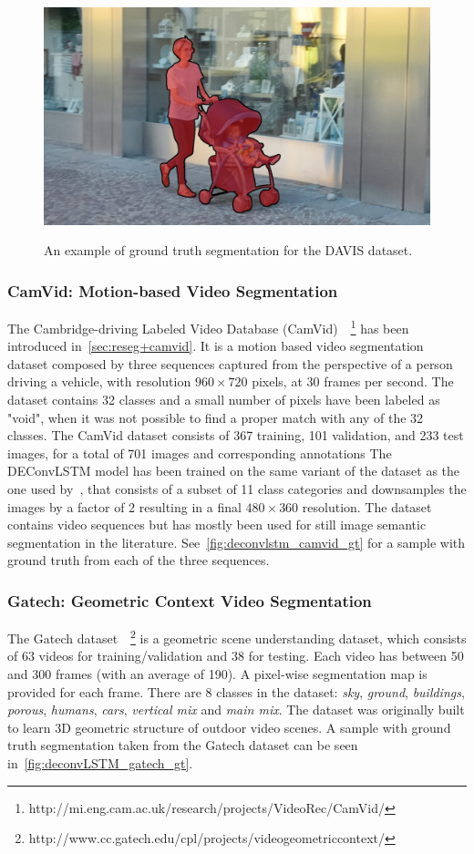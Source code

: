 \begin{figure}[t]
    \includegraphics[width=0.3\columnwidth]{img/deconvLSTM/davis_gt9.jpg}\\
    \caption{An example of ground truth segmentation for the DAVIS dataset.}
    \label{fig:deconvlstm_davis_gt}
\end{figure}


\subsubsection{CamVid: Motion-based Video Segmentation}
\label{sec:deconvLSTM_camvid}
The Cambridge-driving Labeled Video Database (CamVid)~\citep{
Brostow2010semantic}~\footnote{%
http://mi.eng.cam.ac.uk/research/projects/VideoRec/CamVid/}
has been introduced in~\autoref{sec:reseg+camvid}. It is a motion based video
segmentation dataset composed by three sequences captured from the perspective
of a person driving a vehicle, with resolution $960 \times 720$ pixels, at 30
frames per second. The dataset contains 32 classes and a small number of pixels
have been labeled as "void", when it was not possible to find a proper match
with any of the 32 classes. The CamVid dataset consists of 367 training, 101
validation, and 233 test images, for a total of 701 images and corresponding
annotations The DEConvLSTM model has been trained on the same variant of the
dataset as the one used by~\cite{badrinarayanan2015segnet}, that consists of a
subset of 11 class categories and downsamples the images by a factor of 2
resulting in a final $480 \times 360$ resolution. The dataset contains video
sequences but has mostly been used for still image semantic segmentation in the
literature. See~\autoref{fig:deconvlstm_camvid_gt} for a sample with ground
truth from each of the three sequences.


\subsubsection{Gatech: Geometric Context Video Segmentation}
\label{sec:deconvLSTM_gatech}
The Gatech dataset~\citep{VideoGeometricContext2013}~\footnote{%
http://www.cc.gatech.edu/cpl/projects/videogeometriccontext/}
is a geometric scene understanding dataset, which consists of 63 videos for
training/validation and 38 for testing. Each video has between 50 and 300
frames (with an average of 190). A pixel-wise segmentation map is provided for
each frame. There are 8 classes in the dataset: \textit{sky}, \textit{ground},
\textit{buildings}, \textit{porous}, \textit{humans}, \textit{cars},
\textit{vertical mix} and \textit{main mix}. The dataset was originally built
to learn 3D geometric structure of outdoor video scenes. A sample with ground
truth segmentation taken from the Gatech dataset can be seen
in~\autoref{fig:deconvLSTM_gatech_gt}.


